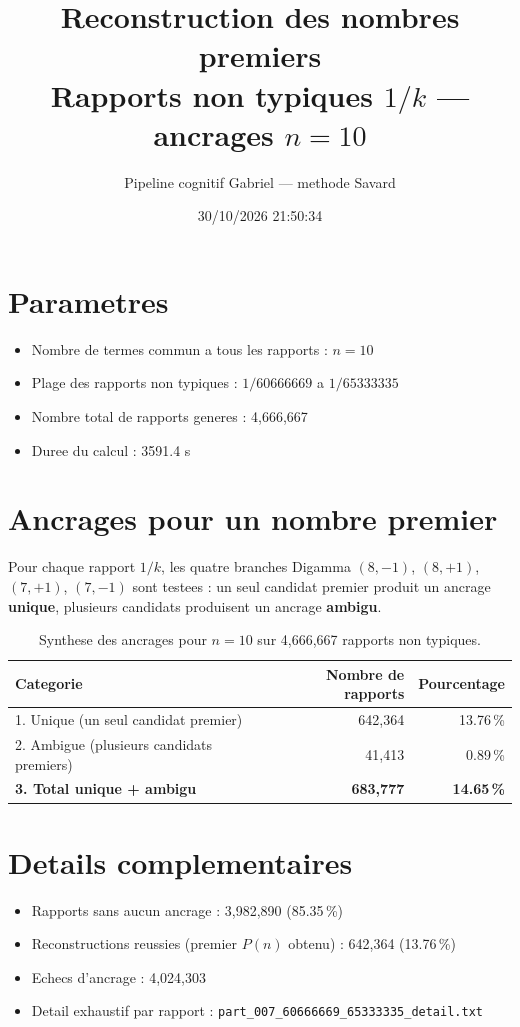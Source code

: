 \documentclass[12pt]{article}
\title{Reconstruction des nombres premiers\\Rapports non typiques $1/k$ --- ancrages $n=10$
}
\author{Pipeline cognitif Gabriel --- methode Savard}
\date{30/10/2026 21:50:34}
\begin{document}
\maketitle

\section*{Parametres}
\begin{itemize}
\item Nombre de termes commun a tous les rapports : $n=10$
\item Plage des rapports non typiques : $1/60666669$ a $1/65333335$
\item Nombre total de rapports generes : 4,666,667
\item Duree du calcul : 3591.4 s
\end{itemize}

\section*{Ancrages pour un nombre premier}

Pour chaque rapport $1/k$, les quatre branches Digamma $(8,-1)$, $(8,+1)$, $(7,+1)$, $(7,-1)$ sont testees : un seul candidat premier produit un ancrage \textbf{unique}, plusieurs candidats produisent un ancrage \textbf{ambigu}.

\begin{table}[h!]
\centering
\caption{Synthese des ancrages pour $n=10$ sur 4,666,667 rapports non typiques.}
\begin{tabular}{lrr}
\toprule
\textbf{Categorie} & \textbf{Nombre de rapports} & \textbf{Pourcentage} \\
\midrule
1. Unique (un seul candidat premier) & 642,364 & 13.76\,\% \\
2. Ambigue (plusieurs candidats premiers) & 41,413 & 0.89\,\% \\
\midrule
\textbf{3. Total unique + ambigu} & \textbf{683,777} & \textbf{14.65\,\%} \\
\bottomrule
\end{tabular}
\end{table}

\section*{Details complementaires}
\begin{itemize}
\item Rapports sans aucun ancrage : 3,982,890 (85.35\,\%)
\item Reconstructions reussies (premier $P(n)$ obtenu) : 642,364 (13.76\,\%)
\item Echecs d'ancrage : 4,024,303
\item Detail exhaustif par rapport : \texttt{part_007_60666669_65333335_detail.txt}
\end{itemize}
\end{document}
